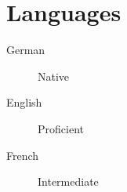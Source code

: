 \section{Languages}
\begin{description}
    \item[German] Native
    \item[English] Proficient
    \item[French] Intermediate
\end{description}
